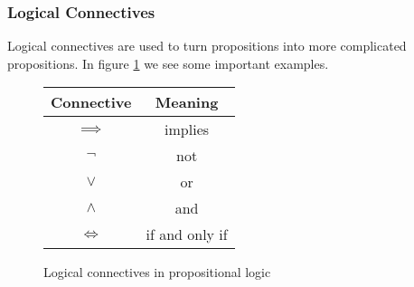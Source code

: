 \documentclass[11pt]{article}
\begin{document}
\subsubsection{Logical Connectives}
Logical connectives are used to turn propositions into more complicated propositions. In figure \ref{fig:propositionalConnectives} we see some important examples.
\begin{figure}[H]
    \caption{Logical connectives in propositional logic}
    \label{fig:propositionalConnectives}
    \centering
    \begin{tabular}{|c|c|}
        \hline
        Connective & Meaning  \\ \hline \hline
        $\implies$ & implies \\ \hline
        $\neg$ & not \\ \hline
        $\lor$ & or \\ \hline  
        $\land$ & and \\ \hline
        $\iff$ & if and only if \\ \hline
    \end{tabular}
\end{figure}
\end{document}
